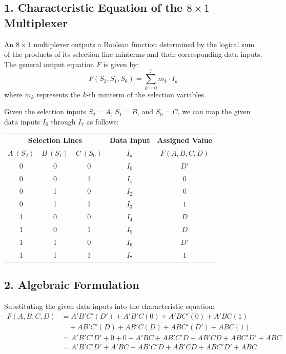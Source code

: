 \documentclass[12pt,a3paper]{article}
\begin{document}
\begin{enumerate}
\begin{tcolorbox}[enhanced,breakable,ansbox,colback=cD!4,colframe=cD,boxrule=0.8pt,arc=5pt,title={\textbf{Answer}},fonttitle=\bfseries\color{white},colbacktitle=cD]

\subsection*{1. Characteristic Equation of the $8 \times 1$ Multiplexer}
An $8 \times 1$ multiplexer outputs a Boolean function determined by the logical sum of the products of its selection line minterms and their corresponding data inputs. The general output equation $F$ is given by:
\[ F(S_2, S_1, S_0) = \sum_{k=0}^{7} m_k \cdot I_k \]
where $m_k$ represents the $k$-th minterm of the selection variables. 

Given the selection inputs $S_2 = A$, $S_1 = B$, and $S_0 = C$, we can map the given data inputs $I_0$ through $I_7$ as follows:

\begin{center}
\renewcommand{\arraystretch}{1.3}
\begin{tabular}{ccc | c | c}
\toprule
\multicolumn{3}{c|}{\textbf{Selection Lines}} & \textbf{Data Input} & \textbf{Assigned Value} \\
$A \ (S_2)$ & $B \ (S_1)$ & $C \ (S_0)$ & $I_k$ & $F(A,B,C,D)$ \\
\midrule
0 & 0 & 0 & $I_0$ & $D'$ \\
0 & 0 & 1 & $I_1$ & $0$ \\
0 & 1 & 0 & $I_2$ & $0$ \\
0 & 1 & 1 & $I_3$ & $1$ \\
1 & 0 & 0 & $I_4$ & $D$ \\
1 & 0 & 1 & $I_5$ & $D$ \\
1 & 1 & 0 & $I_6$ & $D'$ \\
1 & 1 & 1 & $I_7$ & $1$ \\
\bottomrule
\end{tabular}
\end{center}

\vspace{0.2cm}
\subsection*{2. Algebraic Formulation}
Substituting the given data inputs into the characteristic equation:
\begin{align*}
    F(A,B,C,D) &= A'B'C'(D') + A'B'C(0) + A'BC'(0) + A'BC(1) \\
               &\quad + AB'C'(D) + AB'C(D) + ABC'(D') + ABC(1) \\[8pt]
    &= A'B'C'D' + 0 + 0 + A'BC + AB'C'D + AB'CD + ABC'D' + ABC \\
    &= A'B'C'D' + A'BC + AB'C'D + AB'CD + ABC'D' + ABC
\end{align*}


\end{tcolorbox}
\end{enumerate}
\end{document}
